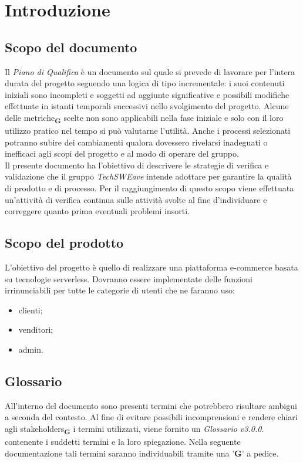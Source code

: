 \section{Introduzione}
\subsection{Scopo del documento}
Il \textit{Piano di Qualifica} è un documento sul quale si prevede di lavorare per l'intera durata del progetto seguendo una
logica di tipo incrementale: i suoi contenuti iniziali sono incompleti e soggetti ad aggiunte significative e possibili modifiche
effettuate in istanti temporali successivi nello svolgimento del progetto.
Alcune delle metriche\textsubscript{\textbf{G}} scelte non sono applicabili nella fase iniziale e solo con il loro utilizzo pratico nel tempo
si può valutarne l'utilità. Anche i processi selezionati potranno subire dei cambiamenti qualora dovessero rivelarsi
inadeguati o inefficaci agli scopi del progetto e al modo di operare del gruppo.\\
Il presente documento ha l'obiettivo di descrivere le strategie di verifica e validazione che il gruppo \textit{TechSWEave} intende
adottare per garantire la qualità di prodotto e di processo. Per il raggiungimento di questo scopo viene effettuata
un'attività di verifica continua sulle attività svolte al fine d'individuare e correggere quanto prima
eventuali problemi insorti.
\subsection{Scopo del prodotto}
L'obiettivo del progetto è quello di realizzare una piattaforma e-commerce basata su tecnologie serverless. Dovranno essere implementate delle funzioni irrinunciabili per tutte le categorie di utenti che ne faranno uso:
\begin{itemize}
    \item clienti;
    \item venditori;
    \item admin.
\end{itemize}
\subsection{Glossario}
All'interno del documento sono presenti termini che potrebbero risultare ambigui a seconda del contesto. Al fine di evitare possibili incomprensioni
e rendere chiari agli stakeholders\textsubscript{\textbf{G}} i termini utilizzati, viene fornito un \textit{Glossario v3.0.0.} contenente i suddetti termini
e la loro spiegazione. Nella seguente documentazione tali termini saranno individuabili tramite una '\textbf{G}' a pedice.

